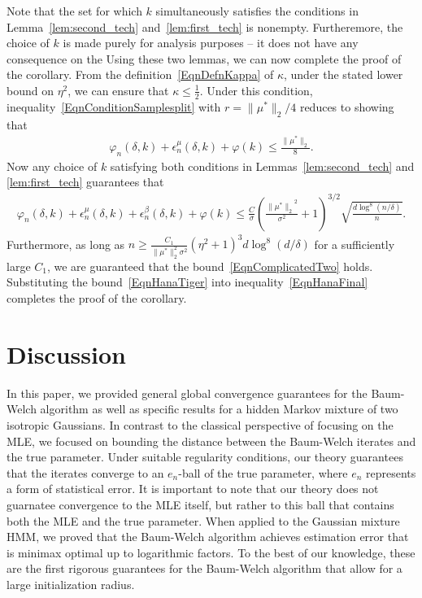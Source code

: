 \documentclass[twoside,11pt]{article}
\newcommand{\numobs}{\ensuremath{n}}
\newcommand{\usedim}{\ensuremath{d}}
\newcommand{\norm}[1]{\ensuremath{\|#1\|_2}}
\newcommand{\subsize}{\numobs} %
\newcommand{\epsilonobs}{\epsilon^\paramobs}
\newcommand{\epsilontrans}{\epsilon^\paramtrans}
\newcommand{\paramobs}{\mu}
\newcommand{\trueparamobs}{\ensuremath{\paramobs^*}}
\newcommand{\paramtrans}{\beta}
\newcommand{\SNR}{\eta^2}
\newcommand{\kdim}{\ensuremath{k}}
\newcommand{\BOUNDFUN}{\ensuremath{\varphi}}
\newcommand{\mustar}{\ensuremath{\mu^*}}
\newcommand{\BIGCON}{\ensuremath{C}}
\newcommand{\minimaxrad}{\ensuremath{e_\numobs}}
\begin{document}
Note that the set for which $\kdim$ simultaneously satisfies the conditions
in Lemma~\ref{lem:second_tech} and~\ref{lem:first_tech} is nonempty. 
Furtheremore, the choice of $\kdim$ is made purely for analysis 
purposes -- it does not have any consequence on the 
Using these two lemmas, we can now complete the proof of the
corollary.  From the definition~\eqref{EqnDefnKappa} of $\kappa$,
under the stated lower bound on $\SNR$, we can ensure that $\kappa \leq \frac{1}{2}$.
Under this condition, inequality~\eqref{EqnConditionSamplesplit} with \mbox{$r
  = \|\mustar\|_2/4$} reduces to showing that
\begin{align}
\label{EqnComplicatedTwo}
\BOUNDFUN_{\subsize}(\delta, \kdim) + \epsilonobs_{\subsize}
(\delta, \kdim) + \BOUNDFUN (\kdim) \leq 
\frac{\|\trueparamobs\|_2}{8}. %
\end{align}
Now any choice of $k$ satisfying both conditions in
Lemmas~\ref{lem:second_tech} and \ref{lem:first_tech} guarantees that
\begin{align}
\label{EqnHanaTiger}
\varphi_{\subsize} (\delta, \kdim) + \epsilonobs_{\subsize} (\delta,
\kdim) + \epsilontrans_{\subsize} (\delta, \kdim) + \BOUNDFUN(\kdim)
\leq \frac{C}{\sigma}(\frac{\norm{\trueparamobs}^2}{\sigma^2}+1)^{3/2}  \sqrt{\frac{ d
    \log^8 (\numobs/\delta)}{\numobs}}.
\end{align}
Furthermore, as long as $\numobs \geq \frac{\BIGCON_1}{\|\trueparamobs\|_2^2\sigma^2} 
(\SNR+1)^3  \usedim \log^8(  \usedim/\delta)$ for a sufficiently large
$\BIGCON_1$, we are guaranteed that the
bound~\eqref{EqnComplicatedTwo} holds. 
Substituting the bound~\eqref{EqnHanaTiger} into
inequality~\eqref{EqnHanaFinal} completes the proof of the corollary.





\section{Discussion}

In this paper, we provided general global convergence guarantees for
the Baum-Welch algorithm as well as specific results for a hidden
Markov mixture of two isotropic Gaussians.  In contrast to the
classical perspective of focusing on the MLE, we focused on bounding
the distance between the Baum-Welch iterates and the true parameter.
Under suitable regularity conditions, our theory guarantees that the
iterates converge to an $\minimaxrad$-ball of the true parameter,
where $\minimaxrad$ represents a form of statistical error.  It
is important to note that our theory does not guarnatee convergence to
the MLE itself, but rather to this ball that contains both the MLE and
the true parameter.  When applied to the Gaussian mixture HMM, we
proved that the Baum-Welch algorithm achieves estimation error that is minimax
optimal up to logarithmic factors.  To the best of our knowledge,
these are the first rigorous guarantees for the Baum-Welch algorithm
that allow for a large initialization radius.
\end{document}
